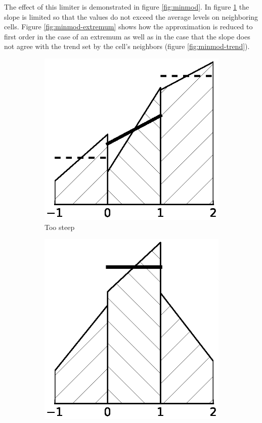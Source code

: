The effect of this limiter is demonstrated in figure \ref{fig:minmod}.
In figure \ref{fig:minmod-steep} the slope is limited so that the values do not exceed the average levels on neighboring cells.
Figure \ref{fig:minmod-extremum} shows how the approximation is reduced to first order in the case of an extremum as well as in the case that the slope does not agree with the trend set by the cell's neighbors (figure \ref{fig:minmod-trend}).
\begin{figure}[h]
  \centering
  \begin{subfigure}{0.5\columnwidth}
    \centering
    \includegraphics[width=\textwidth]{figures/minmod-a}
    \caption{Too steep}
    \label{fig:minmod-steep}
  \end{subfigure}
  \begin{subfigure}{0.5\columnwidth}
    \centering
    \includegraphics[width=\textwidth]{figures/minmod-b}

\end{subfigure}
\end{figure}
